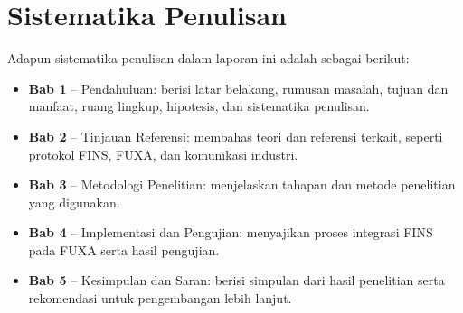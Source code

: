\section{Sistematika Penulisan}
Adapun sistematika penulisan dalam laporan ini adalah sebagai berikut:
\begin{itemize}
    \item \textbf{Bab 1} – Pendahuluan: berisi latar belakang, rumusan masalah, tujuan dan manfaat, ruang lingkup, hipotesis, dan sistematika penulisan.
    \item \textbf{Bab 2} – Tinjauan Referensi: membahas teori dan referensi terkait, seperti protokol FINS, FUXA, dan komunikasi industri.
    \item \textbf{Bab 3} – Metodologi Penelitian: menjelaskan tahapan dan metode penelitian yang digunakan.
    \item \textbf{Bab 4} – Implementasi dan Pengujian: menyajikan proses integrasi FINS pada FUXA serta hasil pengujian.
    \item \textbf{Bab 5} – Kesimpulan dan Saran: berisi simpulan dari hasil penelitian serta rekomendasi untuk pengembangan lebih lanjut.
\end{itemize}
